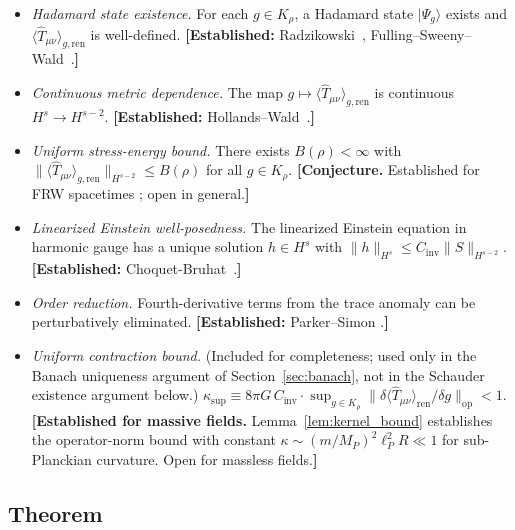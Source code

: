 \documentclass[12pt,a4paper]{article}
\begin{document}
\begin{itemize}
\item[\textbf{(A1)}] \textit{Hadamard state existence.} For each $g\in K_\rho$, a
Hadamard state $|\Psi_g\rangle$ exists and $\langle\hat{T}_{\mu\nu}\rangle_{g,\text{ren}}$
is well-defined. \textbf{[Established:} Radzikowski~\cite{radzikowski},
Fulling--Sweeny--Wald~\cite{fulling_sweeny_wald}.\textbf{]}

\item[\textbf{(A2)}] \textit{Continuous metric dependence.} The map $g\mapsto
\langle\hat{T}_{\mu\nu}\rangle_{g,\text{ren}}$ is continuous $H^s\to H^{s-2}$.
\textbf{[Established:} Hollands--Wald~\cite{hollands_wald_wick}.\textbf{]}

\item[\textbf{(A3)}] \textit{Uniform stress-energy bound.} There exists $B(\rho)<\infty$
with $\|\langle\hat{T}_{\mu\nu}\rangle_{g,\text{ren}}\|_{H^{s-2}} \leq B(\rho)$ for all
$g\in K_\rho$. \textbf{[Conjecture.} Established for FRW spacetimes
\cite{pinamonti_siemssen}; open in general.\textbf{]}

\item[\textbf{(A4)}] \textit{Linearized Einstein well-posedness.} The linearized Einstein
equation in harmonic gauge has a unique solution $h\in H^s$ with
$\|h\|_{H^s} \leq C_{\text{inv}}\|S\|_{H^{s-2}}$.
\textbf{[Established:} Choquet-Bruhat~\cite{choquet_bruhat}.\textbf{]}

\item[\textbf{(A5)}] \textit{Order reduction.} Fourth-derivative terms from the trace
anomaly can be perturbatively eliminated. \textbf{[Established:} Parker--Simon
\cite{parker_simon}.\textbf{]}

\item[\textbf{(A6)}] \textit{Uniform contraction bound.}
(Included for completeness; used only in the Banach uniqueness argument of Section~\ref{sec:banach}, not in the Schauder existence argument below.)\newline
$\kappa_{\sup} \equiv 8\pi G\,C_{\text{inv}}\cdot\sup_{g\in K_\rho}\|\delta\langle\hat{T}_{\mu\nu}\rangle_{\text{ren}}/\delta g\|_{\text{op}} < 1$.
\textbf{[Established for massive fields.} Lemma~\ref{lem:kernel_bound} establishes the
operator-norm bound with constant $\kappa \sim (m/M_P)^2\ell_P^2 R \ll 1$ for
sub-Planckian curvature. Open for massless fields.\textbf{]}
\end{itemize}

\subsection{Theorem}
\end{document}
